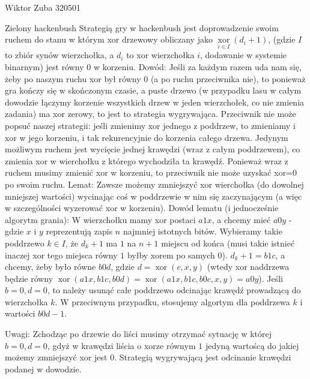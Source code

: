 \documentclass{article}
\DeclareMathOperator{\xor}{xor}
\begin{document}
Wiktor Zuba 320501\newline

Zielony hackenbush\newline
Strategią gry w hackenbush jest doprowadzenie swoim ruchem do stanu w którym xor drzewowy obliczany jako $\xor\limits_{i\in I}(d_i+1)$,
(gdzie $I$ to zbiór synów wierzchołka, a $d_i$ to xor wierzchołka $i$, dodawanie w systemie binarnym) jest równy $0$ w korzeniu.\newline
Dowód:\newline
Jeśli za każdym razem uda nam się, żeby po naszym ruchu xor był równy $0$ (a po ruchu przeciwnika nie), to ponieważ gra kończy się w skończonym czasie,
a puste drzewo (w przypadku lasu w całym dowodzie łączymy korzenie wszystkich drzew w jeden wierzchołek, co nie zmienia zadania) ma xor zerowy,
to jest to strategia wygrywająca.\newline
Przeciwnik nie może popsuć naszej strategii: jeśli zmienimy xor jednego z poddrzew, to zmieniamy i xor w jego korzeniu,
i tak rekurencyjnie do korzenia całego drzewa. Jedynym możliwym ruchem jest wycięcie jednej krawędzi (wraz z całym poddrzewem),
co zmienia xor w wierchołku z którego wychodziła ta krawędź. Ponieważ wraz z ruchem musimy zmienić xor w korzeniu,
to przeciwnik nie może uzyskać xor=0 po swoim ruchu.\newline
Lemat: Zawsze możemy zmniejszyć xor wierchołka (do dowolnej mniejszej wartości) wycinając coś w poddrzewie w nim się zaczynającym (a więc w szczególności wyzerować xor w korzeniu).\newline
Dowód lematu (i jednocześnie algorytm grania):\newline
W wierzchołku mamy xor postaci $a1x$, a chcemy mieć $a0y$ - gdzie $x$ i $y$ reprezentują zapis $n$ najmniej istotnych bitów.\newline
Wybieramy takie poddrzewo $k\in I$, że $d_k+1$ ma $1$ na $n+1$ miejscu od końca (musi takie istnieć inaczej xor tego miejsca równy $1$ byłby xorem po samych $0$).\newline
$d_k+1=b1c$, a chcemy, żeby było równe $b0d$, gdzie $d=\xor(c,x,y)$ (wtedy xor naddrzewa będzie równy $\xor(a1x,b1c,b0d)=\xor(a1x,b1c,b0c,x,y)=a0y$).\newline
Jeśli $b=0,d=0$, to należy usunąć całe poddrzewo odcinając krawędź prowadzącą do wierzchołka $k$.
W przeciwnym przypadku, stosujemy algortym dla poddrzewa $k$ i wartości $b0d-1$.\newline

Uwagi: Zchodząc po drzewie do liści musimy otrzymać sytuację w której $b=0,d=0$, gdyż w krawędzi liścia o xorze równym $1$
jedyną wartoścą do jakiej możemy zmniejszyć xor jest $0$.\newline
Strategią wygrywającą jest odcinanie krawędzi podanej w dowodzie.
\newpage
\end{document}
